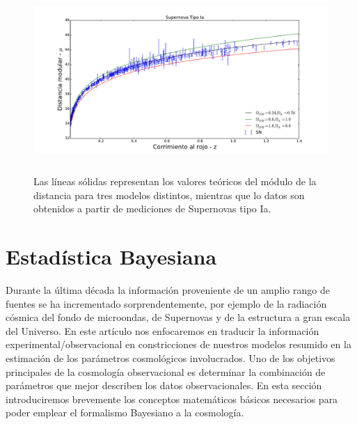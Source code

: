 \documentclass[10.5pt,prb,
               showpacs,            %
               preprintnumbers,     %
               aps,                 %
               prl,          	    %
               letterpaper,             %
               superscriptaddress,      %
               nofootinbib,         %
               tightenlines,        %
               floats,floatfix      %
               ,usenatbib]{revtex4-1}%
\begin{document}
\begin{figure}[th]
\begin{center}
\includegraphics[trim =  0mm  0mm 0mm 0mm, clip, width=14cm, height=7cm]{SN_models.pdf} 
\end{center}
\caption[Geometries of the spacetime]
{Las l\'ineas s\'olidas representan los valores te\'oricos del m\'odulo de la distancia para tres modelos distintos,
mientras que lo datos son obtenidos a partir de mediciones de Supernovas tipo Ia.}
\label{Fig:SNs}
\end{figure}


\section{Estad\'istica Bayesiana}



Durante la \'ultima d\'ecada la informaci\'on proveniente de un amplio rango de fuentes se ha incrementado sorprendentemente,
por ejemplo de la radiaci\'on c\'osmica del fondo de microondas, de Supernovas y de la estructura a gran escala del Universo.
En este art\'iculo nos enfocaremos en traducir la informaci\'on experimental/observacional en constricciones de nuestros modelos 
resumido en la estimaci\'on de los par\'ametros cosmol\'ogicos involucrados.
Uno de los objetivos principales de la cosmolog\'ia observacional es determinar 
la combinaci\'on de par\'ametros que mejor describen los datos observacionales.
En esta secci\'on introduciremos brevemente los conceptos matem\'aticos b\'asicos 
necesarios para poder emplear el formalismo Bayesiano a la cosmolog\'ia. 
\\
\end{document}
